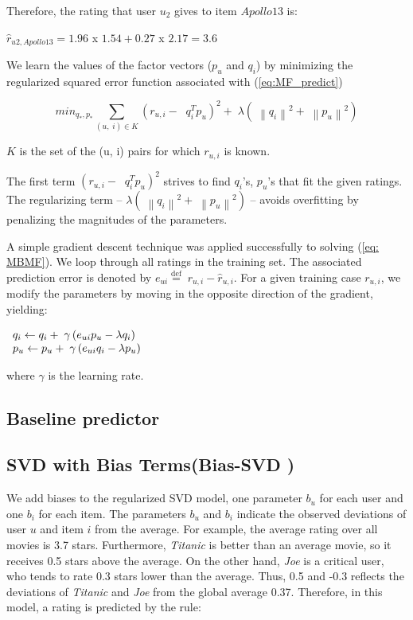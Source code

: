 \documentclass[oneside,13pt]{extreport}
\begin{document}
Therefore, the rating that user $u_2$ gives to item $Apollo 13$ is:

$\hat r_{u2,Apollo 13} = 1.96$ x $1.54 + 0.27$ x $2.17 = 3.6$

We learn the values of the factor vectors (${p_u}$ and ${q_i}$) by minimizing the regularized squared error function associated with (\ref{eq:MF_predict})

\begin{equation}
mi{n_{{q_*},{p_*}}}\mathop \sum \limits_{\left( {u,\;i} \right) \in K} {\left( {{r_{u,i}} - \;\;q_i^T{p_u}} \right)^2} + \;\lambda \left( {\;{{\left\| {{q_i}} \right\|}^2} + \;{{\left\| {{p_u}} \right\|}^2}} \right)
\label{eq: MBMF}
\end{equation}

$K$ is the set of the (u, i) pairs for which $r_{u,i}$ is known. 

The first term ${\left( {{r_{u,i}} - \;\;q_i^T{p_u}} \right)^2}$ strives to find $q_i$'s, $p_u$'s that fit the given ratings.
The regularizing term – $\lambda \left( {\;{{\left\| {{q_i}} \right\|}^2} + \;{{\left\| {{p_u}} \right\|}^2}}  \right)$ – avoids overfitting by penalizing the magnitudes of the parameters.

    A simple gradient descent technique was applied successfully to solving (\ref{eq: MBMF}).
We loop through all ratings in the training set. The associated prediction error is denoted by ${e_{ui}} \stackrel{\text{def}}{=} \;{r_{u,i}} - \hat r_{u,i}$. For a given training case $r_{u,i}$, we modify the parameters by moving in the opposite direction of the gradient, yielding:

$\begin{array}{l}{q_i} \leftarrow {q_i} + {\rm{\;}}\gamma \left( {{e_{ui}}{p_u} - {\lambda}{q_i}} \right)\\{p_u} \leftarrow {p_u} + {\rm{\;}}\gamma \left( {{e_{ui}}{q_i} - {\lambda}{p_u}} \right)\end{array}
$

where $\gamma$ is the learning rate.
    

\subsection{Baseline predictor}

\subsection{SVD with Bias Terms(Bias-SVD )}
We add biases to the regularized SVD model, one parameter $b_u$ for each user and one $b_i$ for each item. The parameters $b_u$ and $b_i$ indicate the observed deviations of user $u$ and item $i$ from the average. For example, the average rating over all movies is 3.7 stars. Furthermore, \emph{Titanic} is better than an average movie, so it receives 0.5 stars above the average. On the other hand, \emph{Joe} is a critical user, who tends to rate 0.3 stars lower than the average. Thus, 0.5 and -0.3 reflects the deviations of \emph{Titanic} and \emph{Joe} from the global average 0.37. Therefore, in this model,
a rating is predicted by the rule:
\end{document}
